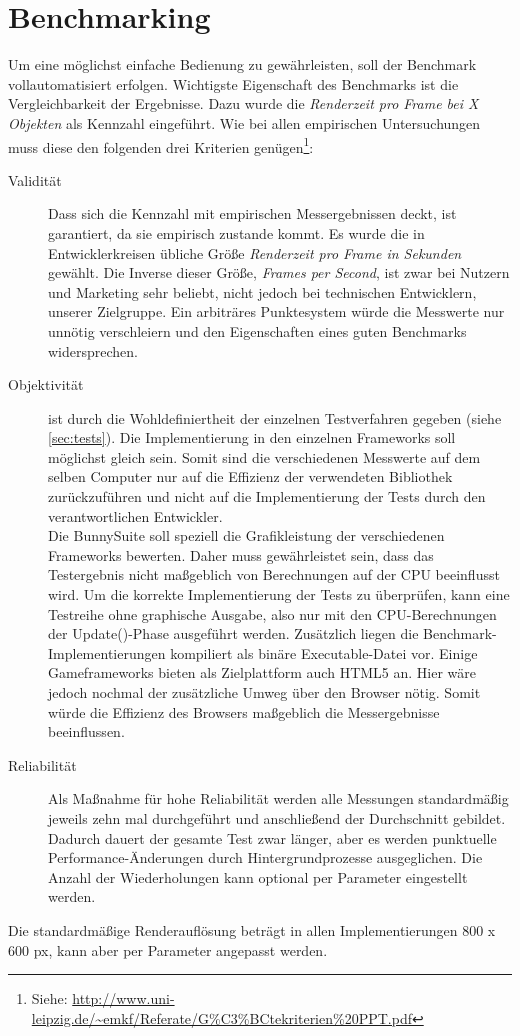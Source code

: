 \section{Benchmarking}
Um eine möglichst einfache Bedienung zu gewährleisten, soll der Benchmark vollautomatisiert erfolgen. Wichtigste Eigenschaft des Benchmarks ist die Vergleichbarkeit der Ergebnisse. Dazu wurde die \textit{Renderzeit pro Frame bei X Objekten} als Kennzahl eingeführt. Wie bei allen empirischen Untersuchungen muss diese den folgenden drei Kriterien genügen\footnote{Siehe: \url{http://www.uni-leipzig.de/~emkf/Referate/G\%C3\%BCtekriterien\%20PPT.pdf}}:\\
\begin{description}
\item[Validität] Dass sich die Kennzahl mit empirischen Messergebnissen deckt, ist garantiert, da sie empirisch zustande kommt. Es wurde die in Entwicklerkreisen übliche Größe {\em Renderzeit pro Frame in Sekunden} gewählt. Die Inverse dieser Größe, {\em Frames per Second}, ist zwar bei Nutzern und Marketing sehr beliebt, nicht jedoch bei technischen Entwicklern, unserer Zielgruppe. Ein arbiträres Punktesystem würde die Messwerte nur unnötig verschleiern und den Eigenschaften eines guten Benchmarks widersprechen.\\

\item[Objektivität] ist durch die Wohldefiniertheit der einzelnen Testverfahren gegeben (siehe \ref{sec:tests}). Die Implementierung in den einzelnen Frameworks soll möglichst gleich sein. Somit sind die verschiedenen Messwerte auf dem selben Computer nur auf die Effizienz der verwendeten Bibliothek zurückzuführen und nicht auf die Implementierung der Tests durch den verantwortlichen Entwickler.\\
Die BunnySuite soll speziell die Grafikleistung der verschiedenen Frameworks bewerten. Daher muss gewährleistet sein, dass das Testergebnis nicht maßgeblich von Berechnungen auf der CPU beeinflusst wird. Um die korrekte Implementierung der Tests zu überprüfen, kann eine Testreihe ohne graphische Ausgabe, also nur mit den CPU-Berechnungen der Update()-Phase ausgeführt werden.
Zusätzlich liegen die Benchmark-Implementierungen kompiliert als binäre Executable-Datei vor. Einige Gameframeworks bieten als Zielplattform auch HTML5 an. Hier wäre jedoch nochmal der zusätzliche Umweg über den Browser nötig. Somit würde die Effizienz des Browsers maßgeblich die Messergebnisse beeinflussen.\\

\item[Reliabilität] Als Maßnahme für hohe Reliabilität werden alle Messungen standardmäßig jeweils zehn mal durchgeführt und anschließend der Durchschnitt gebildet. Dadurch dauert der gesamte Test zwar länger, aber es werden punktuelle Performance-Änderungen durch Hintergrundprozesse ausgeglichen. Die Anzahl der Wiederholungen kann optional per Parameter eingestellt werden.\\
\end{description}
Die standardmäßige Renderauflösung beträgt in allen Implementierungen 800 x 600 px, kann aber per Parameter angepasst werden.

